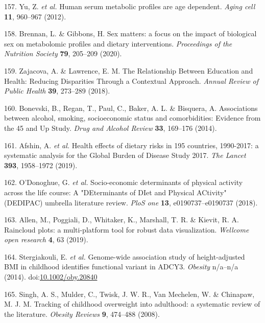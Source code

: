 \documentclass[11pt,twoside]{bristolthesis}
\begin{document}
\leavevmode\hypertarget{ref-Yu2012}{}%
157. Yu, Z. \emph{et al.} Human serum metabolic profiles are age dependent. \emph{Aging cell} \textbf{11}, 960--967 (2012).

\leavevmode\hypertarget{ref-Brennan2020}{}%
158. Brennan, L. \& Gibbons, H. Sex matters: a focus on the impact of biological sex on metabolomic profiles and dietary interventions. \emph{Proceedings of the Nutrition Society} \textbf{79}, 205--209 (2020).

\leavevmode\hypertarget{ref-Zajacova2018}{}%
159. Zajacova, A. \& Lawrence, E. M. The Relationship Between Education and Health: Reducing Disparities Through a Contextual Approach. \emph{Annual Review of Public Health} \textbf{39}, 273--289 (2018).

\leavevmode\hypertarget{ref-Bonevski2014}{}%
160. Bonevski, B., Regan, T., Paul, C., Baker, A. L. \& Bisquera, A. Associations between alcohol, smoking, socioeconomic status and comorbidities: Evidence from the 45 and Up Study. \emph{Drug and Alcohol Review} \textbf{33}, 169--176 (2014).

\leavevmode\hypertarget{ref-Afshin2019}{}%
161. Afshin, A. \emph{et al.} Health effects of dietary risks in 195 countries, 1990-2017: a systematic analysis for the Global Burden of Disease Study 2017. \emph{The Lancet} \textbf{393}, 1958--1972 (2019).

\leavevmode\hypertarget{ref-ODonoghue2018}{}%
162. O'Donoghue, G. \emph{et al.} Socio-economic determinants of physical activity across the life course: A "DEterminants of DIet and Physical ACtivity" (DEDIPAC) umbrella literature review. \emph{PloS one} \textbf{13}, e0190737--e0190737 (2018).

\leavevmode\hypertarget{ref-Allen2019}{}%
163. Allen, M., Poggiali, D., Whitaker, K., Marshall, T. R. \& Kievit, R. A. Raincloud plots: a multi-platform tool for robust data visualization. \emph{Wellcome open research} \textbf{4}, 63 (2019).

\leavevmode\hypertarget{ref-Stergiakouli2014}{}%
164. Stergiakouli, E. \emph{et al.} Genome-wide association study of height-adjusted BMI in childhood identifies functional variant in ADCY3. \emph{Obesity} n/a--n/a (2014). doi:\href{https://doi.org/10.1002/oby.20840}{10.1002/oby.20840}

\leavevmode\hypertarget{ref-Singh2008}{}%
165. Singh, A. S., Mulder, C., Twisk, J. W. R., Van Mechelen, W. \& Chinapaw, M. J. M. Tracking of childhood overweight into adulthood: a systematic review of the literature. \emph{Obesity Reviews} \textbf{9}, 474--488 (2008).
\end{document}
